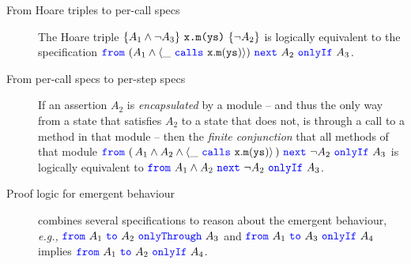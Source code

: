  \begin{description}
 \item
 [From Hoare triples to per-call specs] 
  The Hoare triple 
$ \{ A_1 \wedge \neg A_3 \} \ \prg{x.m(ys)}\  \{ \neg A_2 \}$ is logically equivalent 
 {to} the specification
$ \onlyIfSingle {(A_1 \wedge  \calls{\_}{\prg{x}}{\prg{m}}{\prg{ys}} )} {A_2} {A_3}$.  
 
 \item 
 [From per-call specs to per-step specs] %
 If an assertion $A_2$  is \emph{encapsulated} by a module -- and thus the only way from a 
 state that satisfies $A_2$ to a state that does not, is through a call to a method in that module -- then
{the
\emph{finite conjunction}
that all methods of that module {$ \onlyIfSingle {(\, A_1 \wedge A_2 \wedge {\calls{\_}{\prg{x}}{\prg{m}}{\prg{ys}}}\, )} {\neg  A_2} {A_3}$}
  is logically equivalent 
 {to}
{$ \onlyIfSingle {A_1 \wedge A_2} {\neg A_2} {A_3}$. }}
 
  \item [Proof logic  for emergent behaviour] %
  combines several specifications to reason about the
  emergent behaviour, \emph{e.g.,} 
   $ \onlyThrough  {A_1} {A_2} {A_3}$  and $ \onlyIf  {A_1} {A_3} {A_4}$ implies 
   $ \onlyIf  {A_1} {A_2} {A_4}$.
 \end{description}




